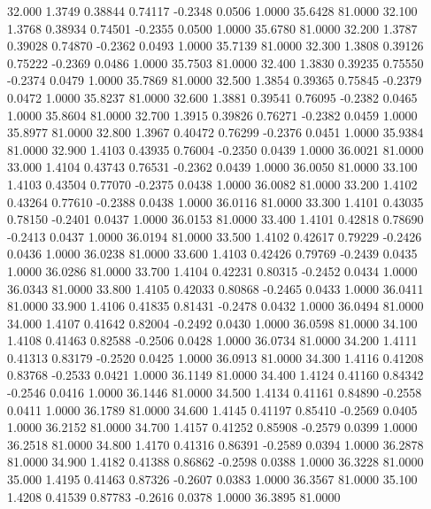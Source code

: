   32.000   1.3749   0.38844   0.74117  -0.2348   0.0506   1.0000  35.6428  81.0000
  32.100   1.3768   0.38934   0.74501  -0.2355   0.0500   1.0000  35.6780  81.0000
  32.200   1.3787   0.39028   0.74870  -0.2362   0.0493   1.0000  35.7139  81.0000
  32.300   1.3808   0.39126   0.75222  -0.2369   0.0486   1.0000  35.7503  81.0000
  32.400   1.3830   0.39235   0.75550  -0.2374   0.0479   1.0000  35.7869  81.0000
  32.500   1.3854   0.39365   0.75845  -0.2379   0.0472   1.0000  35.8237  81.0000
  32.600   1.3881   0.39541   0.76095  -0.2382   0.0465   1.0000  35.8604  81.0000
  32.700   1.3915   0.39826   0.76271  -0.2382   0.0459   1.0000  35.8977  81.0000
  32.800   1.3967   0.40472   0.76299  -0.2376   0.0451   1.0000  35.9384  81.0000
  32.900   1.4103   0.43935   0.76004  -0.2350   0.0439   1.0000  36.0021  81.0000
  33.000   1.4104   0.43743   0.76531  -0.2362   0.0439   1.0000  36.0050  81.0000
  33.100   1.4103   0.43504   0.77070  -0.2375   0.0438   1.0000  36.0082  81.0000
  33.200   1.4102   0.43264   0.77610  -0.2388   0.0438   1.0000  36.0116  81.0000
  33.300   1.4101   0.43035   0.78150  -0.2401   0.0437   1.0000  36.0153  81.0000
  33.400   1.4101   0.42818   0.78690  -0.2413   0.0437   1.0000  36.0194  81.0000
  33.500   1.4102   0.42617   0.79229  -0.2426   0.0436   1.0000  36.0238  81.0000
  33.600   1.4103   0.42426   0.79769  -0.2439   0.0435   1.0000  36.0286  81.0000
  33.700   1.4104   0.42231   0.80315  -0.2452   0.0434   1.0000  36.0343  81.0000
  33.800   1.4105   0.42033   0.80868  -0.2465   0.0433   1.0000  36.0411  81.0000
  33.900   1.4106   0.41835   0.81431  -0.2478   0.0432   1.0000  36.0494  81.0000
  34.000   1.4107   0.41642   0.82004  -0.2492   0.0430   1.0000  36.0598  81.0000
  34.100   1.4108   0.41463   0.82588  -0.2506   0.0428   1.0000  36.0734  81.0000
  34.200   1.4111   0.41313   0.83179  -0.2520   0.0425   1.0000  36.0913  81.0000
  34.300   1.4116   0.41208   0.83768  -0.2533   0.0421   1.0000  36.1149  81.0000
  34.400   1.4124   0.41160   0.84342  -0.2546   0.0416   1.0000  36.1446  81.0000
  34.500   1.4134   0.41161   0.84890  -0.2558   0.0411   1.0000  36.1789  81.0000
  34.600   1.4145   0.41197   0.85410  -0.2569   0.0405   1.0000  36.2152  81.0000
  34.700   1.4157   0.41252   0.85908  -0.2579   0.0399   1.0000  36.2518  81.0000
  34.800   1.4170   0.41316   0.86391  -0.2589   0.0394   1.0000  36.2878  81.0000
  34.900   1.4182   0.41388   0.86862  -0.2598   0.0388   1.0000  36.3228  81.0000
  35.000   1.4195   0.41463   0.87326  -0.2607   0.0383   1.0000  36.3567  81.0000
  35.100   1.4208   0.41539   0.87783  -0.2616   0.0378   1.0000  36.3895  81.0000
